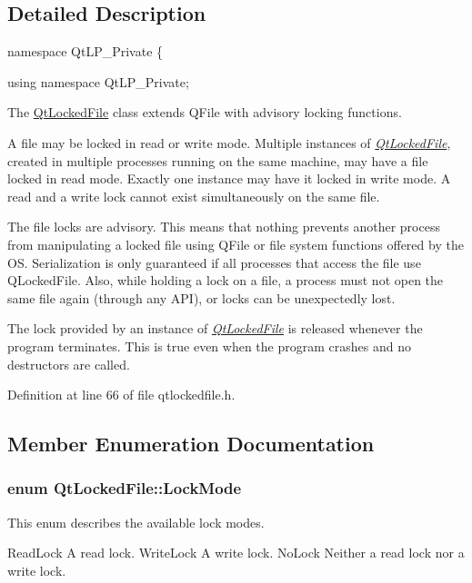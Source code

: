 \subsection{Detailed Description}
namespace QtLP\_\-Private \{ 

using namespace QtLP\_\-Private;

The \hyperlink{class_qt_locked_file}{QtLockedFile} class extends QFile with advisory locking functions.

A file may be locked in read or write mode. Multiple instances of {\itshape \hyperlink{class_qt_locked_file}{QtLockedFile}\/}, created in multiple processes running on the same machine, may have a file locked in read mode. Exactly one instance may have it locked in write mode. A read and a write lock cannot exist simultaneously on the same file.

The file locks are advisory. This means that nothing prevents another process from manipulating a locked file using QFile or file system functions offered by the OS. Serialization is only guaranteed if all processes that access the file use QLockedFile. Also, while holding a lock on a file, a process must not open the same file again (through any API), or locks can be unexpectedly lost.

The lock provided by an instance of {\itshape \hyperlink{class_qt_locked_file}{QtLockedFile}\/} is released whenever the program terminates. This is true even when the program crashes and no destructors are called. 

Definition at line 66 of file qtlockedfile.h.



\subsection{Member Enumeration Documentation}
\hypertarget{class_qt_locked_file_aef385609a0a280b52334b972b04074cc}{
\subsubsection[{LockMode}]{\setlength{\rightskip}{0pt plus 5cm}enum {\bf QtLockedFile::LockMode}}}
\label{class_qt_locked_file_aef385609a0a280b52334b972b04074cc}
This enum describes the available lock modes.

ReadLock A read lock.  WriteLock A write lock.  NoLock Neither a read lock nor a write lock. 

